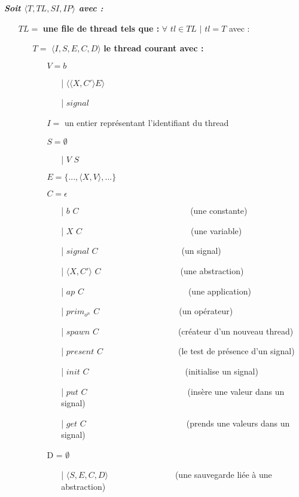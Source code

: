 \documentclass[10pt,a4paper]{article}
\begin{document}
				\textbf{\textit{Soit $\langle T,TL,SI,IP\rangle$ avec :}}
				
				\begin{itemize}
					\item[] $TL =$ \textbf{une file de thread tels que :} $\forall$ $tl \in TL$ $|$ $tl = T$ avec :
					\begin{itemize}
					  \item[] $T =$ $\langle I,S,E,C,D\rangle$ \textbf{le thread courant avec :}
					  \begin{itemize}
					  	\item[] $V = b$	
					  	\begin{itemize}
					  		\item[|] $\langle\langle X,C' \rangle E\rangle$
					  		\item[|] $signal$
					  	\end{itemize}
					  	\item[] $I =$ un entier représentant l'identifiant du thread
					  	\item[] $S =  \emptyset$ 
					  	\begin{itemize}
					  		\item[|] $V$ $S$
					  	\end{itemize}
					  	\item[] $E = \{...,\langle X,V\rangle,...\}$
					  	\item[] $C = \epsilon$
					  	\begin{itemize}
					  		\item[|] $b$ $C$~~~~~~~~~~~~~~~~~~~~~~~~~~    (une constante)
					  		\item[|] $X$ $C$~~~~~~~~~~~~~~~~~~~~~~~~~~(une variable)
					  		\item[|] $signal$ $C$~~~~~~~~~~~~~~~~~~~~(un signal)
					  		\item[|] $\langle X,C'\rangle$ $C$~~~~~~~~~~~~~~~~~~~(une abstraction)
					  		\item[|] $ap$ $C$~~~~~~~~~~~~~~~~~~~~~~~~~(une application)
					  		\item[|] $prim_{o^{n}}$ $C$~~~~~~~~~~~~~~~~~~~(un opérateur)
					  		\item[|] $spawn$ $C$~~~~~~~~~~~~~~~~~~~(créateur d'un nouveau thread)
					  		\item[|] $present$ $C$~~~~~~~~~~~~~~~~~~(le test de présence d'un signal)
					  		\item[|] $init$ $C$~~~~~~~~~~~~~~~~~~~~~~~(initialise un signal)
					  		\item[|] $put$ $C$~~~~~~~~~~~~~~~~~~~~~~~~(insère une valeur dans un signal)
					  		\item[|] $get$ $C$~~~~~~~~~~~~~~~~~~~~~~~~(prends une valeurs dans un signal)
					  	\end{itemize}
					  	\item[] D = $\emptyset$
					  	\begin{itemize}
					  		\item[|] $\langle S,E,C,D\rangle$~~~~~~~~~~~~~~~~(une sauvegarde liée à une abstraction)
					  	\end{itemize}
					  \end{itemize}	
					\end{itemize}
					

\end{itemize}
\end{document}
